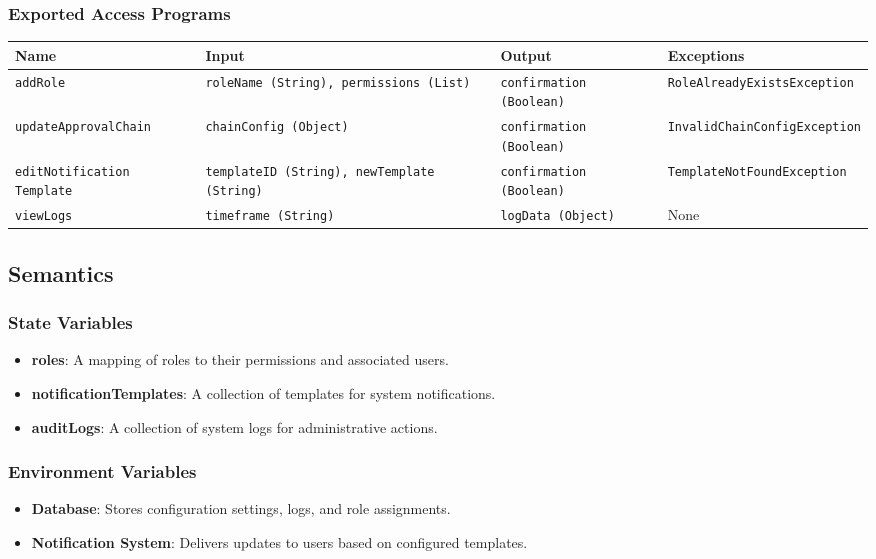 \documentclass[12pt, titlepage]{article}
\begin{document}
\subsubsection{Exported Access Programs}
\begin{center}
    \scriptsize
    \begin{tabular}{|p{3cm}|p{4cm}|p{4cm}|p{4cm}|}
        \hline
        \textbf{Name} & \textbf{Input} & \textbf{Output} & \textbf{Exceptions} \\
        \hline
        \texttt{addRole} & \texttt{roleName (String), permissions (List)} & \texttt{confirmation (Boolean)} & \texttt{RoleAlreadyExistsException} \\
        \hline
        \texttt{updateApprovalChain} & \texttt{chainConfig (Object)} & \texttt{confirmation (Boolean)} & \texttt{InvalidChainConfigException} \\
        \hline
        \texttt{editNotification \newline Template} & \texttt{templateID (String), newTemplate (String)} & \texttt{confirmation (Boolean)} & \texttt{TemplateNotFoundException} \\
        \hline
        \texttt{viewLogs} & \texttt{timeframe (String)} & \texttt{logData (Object)} & None \\
        \hline
    \end{tabular}
\end{center}

\subsection{Semantics}

\subsubsection{State Variables}
\begin{itemize}
    \item \textbf{roles}: A mapping of roles to their permissions and associated users.
    \item \textbf{notificationTemplates}: A collection of templates for system notifications.
    \item \textbf{auditLogs}: A collection of system logs for administrative actions.
\end{itemize}

\subsubsection{Environment Variables}
\begin{itemize}
    \item \textbf{Database}: Stores configuration settings, logs, and role assignments.
    \item \textbf{Notification System}: Delivers updates to users based on configured templates.
\end{itemize}
\end{document}
